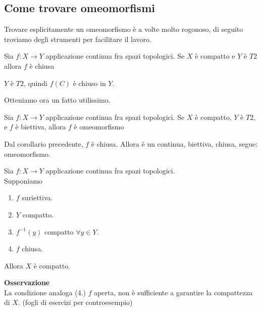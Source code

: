 \documentclass[12px]{article}
\begin{document}
	\subsection{Come trovare omeomorfismi}
	Trovare esplicitamente un omeomorfismo è a volte molto rogonoso, di seguito troviamo degli strumenti per facilitare il lavoro.\\
\begin{coro}
	Sia $f: X \rightarrow Y$ applicazione continua fra spazi topologici. Se $X$ è compatto e $Y$ è $T2$ allora $f$ è chiusa
\end{coro}
\begin{dimo}
	$Y$ è $T2$, quindi $f(C)$ è chiuso in  $Y$.
\end{dimo}
Otteniamo ora un fatto utilissimo.
\begin{coro}
	Sia $f: X \rightarrow Y $ applicazione continua fra spazi topologici. Se $X$ è compatto, $Y$ è $T2$, e $f$ è biettiva, allora $f $ è omeomorfismo
\end{coro}
\begin{dimo}
	Dal corollario precedente, $f$ è chiusa. Allora è un continua, biettiva, chiusa, segue: omeomorfismo.
\end{dimo}
\begin{prop}
	Sia $f : X \rightarrow Y$ applicazione continua fra spazi topologici.\\
	Supponiamo
	\begin{enumerate}
		\item $f$ suriettiva.
		\item $Y$ compatto.
		\item $f^{-1}(y)$ compatto $\forall y\in Y$.
		\item  $f$ chiusa.
	\end{enumerate}
	Allora $X$ è compatto.
\end{prop}
\textbf{Osservazione}\\
La condizione analoga (4.) $f$ aperta, non è sufficiente a garantire la compattezza di $X$. (fogli di esercizi per controesempio)
\end{document}
